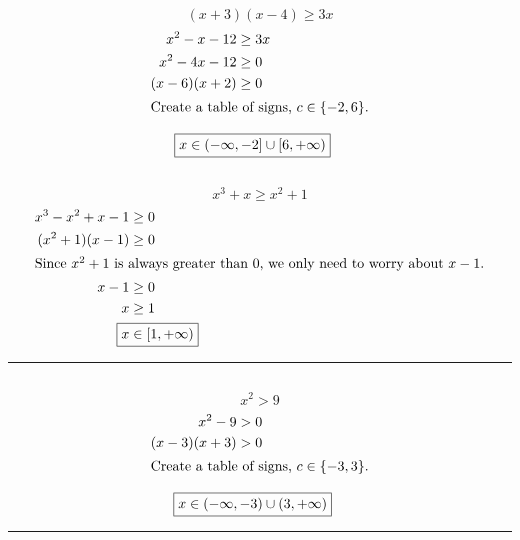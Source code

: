 	\subsection{}
		\[(x + 3)(x - 4) \geq 3x\]
		\begin{align*}
			x^2 - x - 12 &\geq 3x \\
			x^2 - 4x - 12 &\geq 0 \\
			(x - 6)(x + 2) &\geq 0 \\
			\intertext{Create a table of signs, $c \in \{-2, 6\}$.}
		\end{align*}
		\begin{center}\end{center}
		\begin{align*}
			\Aboxed{x &\in (-\infty, -2] \cup [6, +\infty)}
		\end{align*}

	\subsection{}
		\[x^3 + x \geq x^2 + 1\]
		\begin{align*}
			x^3 - x^2 + x - 1 &\geq 0 \\
			(x^2 + 1)(x - 1) &\geq 0 \\
			\intertext{Since $x^2 + 1$ is always greater than $0$, we only need to worry about $x - 1$.}
			x - 1 &\geq 0 \\
			x &\geq 1 \\
			\Aboxed{x &\in [1, +\infty)}
		\end{align*}
		\hrule{}

	\subsection{}
		\[x^2 > 9\]
		\begin{align*}
			x^2 - 9 &> 0 \\
			(x - 3)(x + 3) &> 0 \\
			\intertext{Create a table of signs, $c \in \{-3, 3\}$.}
		\end{align*}
		\begin{center}\end{center}
		\begin{align*}
			\Aboxed{x &\in (-\infty, -3) \cup (3, +\infty)}
		\end{align*}
		\hrule{}

